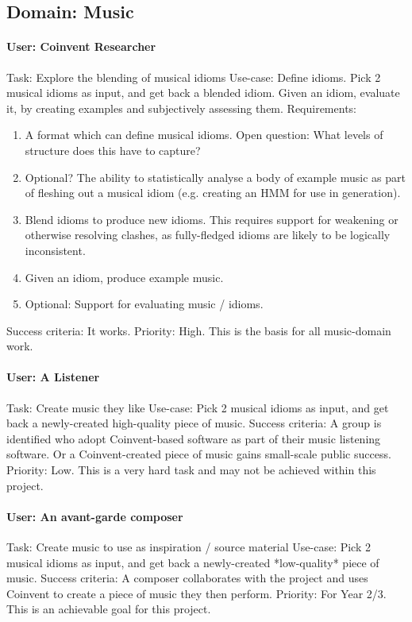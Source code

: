 \documentclass[10pt]{article}
\begin{document}
\begin{appendices}
\subsection{Domain: Music}

\paragraph{User: Coinvent Researcher}
Task: Explore the blending of musical idioms      
Use-case: Define idioms. Pick 2 musical idioms as input, and get back a blended idiom. Given an idiom, evaluate it, by creating examples and subjectively assessing them.   
Requirements: 
\begin{enumerate}
\item A format which can define musical idioms. Open question: What levels of structure does this have to capture?
\item Optional? The ability to statistically analyse a body of example music as part of fleshing out a musical idiom (e.g. creating an HMM for use in generation).
\item Blend idioms to produce new idioms. This requires support for weakening or otherwise resolving clashes, as fully-fledged idioms are likely to be logically inconsistent.
\item Given an idiom, produce example music.
\item Optional: Support for evaluating music / idioms.
\end{enumerate}
Success criteria: It works.       
Priority: High. This is the basis for all music-domain work.
 
\paragraph{User: A Listener}
Task: Create music they like      
Use-case: Pick 2 musical idioms as input, and get back a newly-created high-quality piece of music.
Success criteria: A group is identified who adopt Coinvent-based software as part of their music listening software. Or a Coinvent-created piece of music gains small-scale public success.   
Priority: Low. This is a very hard task and may not be achieved within this project.
 
\paragraph{User: An avant-garde composer}
Task: Create music to use as inspiration / source material   
Use-case: Pick 2 musical idioms as input, and get back a newly-created *low-quality* piece of music.   
Success criteria: A composer collaborates with the project and uses Coinvent to create a piece of music they then perform.      
Priority: For Year 2/3. This is an achievable goal for this project.



\end{appendices}
\end{document}
